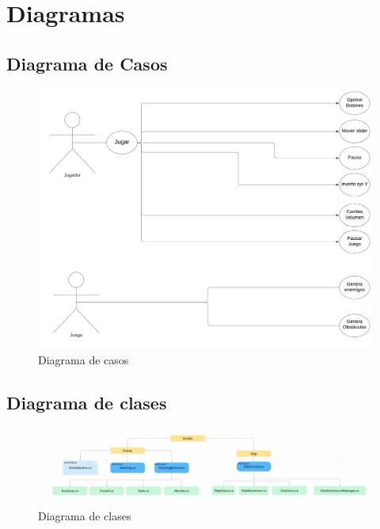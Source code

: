 \documentclass[12pt]{article} %
\begin{document}
\section{Diagramas}\label{diagramas}
\subsection{Diagrama de Casos}

\begin{figure} [!htb]
  \includegraphics[width=\linewidth]{DiaCasos.png}
  \caption{Diagrama de casos}
  \label{fig:Diagrama1}
\end{figure}
\FloatBarrier
\newpage

\subsection{Diagrama de clases}
\begin{figure}  [!htb]
  \includegraphics[width=\linewidth]{clases.jpg}
  \caption{Diagrama de clases}
  \label{fig:Diagrama1}
\end{figure}
\FloatBarrier
\newpage
\end{document}
